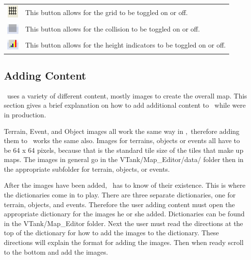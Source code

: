 \begin{table}[]
\begin{tabular}{| c | p{12cm} |}
\includegraphics*{Figures/gridtoggle.png} & This button allows for the grid to be toggled on or 																																			off. \\	[1.0ex]
\includegraphics*{Figures/collisiontoggle.png} & This button allows for the collision to be 																									 												toggled on or off. \\	[1.0ex]
\includegraphics*{Figures/heighttoggle.png} & This button allows for the height indicators to be toggled on or off. \\	[1.0ex]
\hline %
\end{tabular}
\end{table}
\newpage

\subsection{Adding Content}

\MapEditor\ uses a variety of different content, mostly images to create the overall map. This section gives a brief explanation on how to add additional content to \MapEditor\ while were in production.

Terrain, Event, and Object images all work the same way in \MapEditor,\ therefore adding them to \MapEditor\ works the same also. Images for terrains, objects or events all have to be 64 x 64 pixels, because that is the standard tile size of the tiles that make up maps. The images in general go in the VTank/Map\_Editor/data/ folder then in the appropriate subfolder for terrain, objects, or events.

After the images have been added, \MapEditor\ has to know of their existence. This is where the dictionaries come in to play. There are three separate dictionaries, one for terrain, objects, and events. Therefore the user adding content must open the appropriate dictionary for the images he or she added. Dictionaries can be found in the VTank/Map\_Editor folder. Next the user must read the directions at the top of the dictionary for how to add the images to the dictionary. These directions will explain the format for adding the images. Then when ready scroll to the bottom and add the images. 

